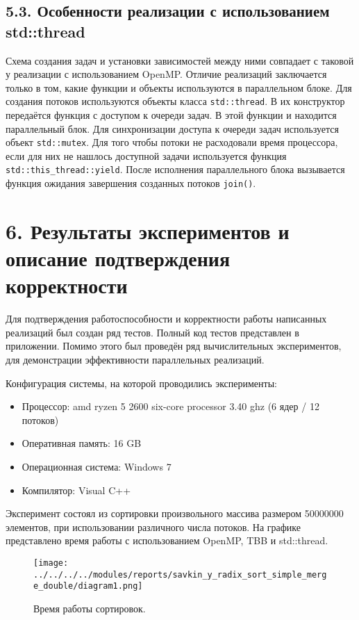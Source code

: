 \documentclass{report}
\begin{document}
    \subsection*{5.3. Особенности реализации с использованием std::thread}
    \par Схема создания задач и установки зависимостей между ними совпадает с таковой у реализации с использованием OpenMP.
         Отличие реализаций заключается только в том, какие функции и объекты используются в параллельном блоке.
         Для создания потоков используются объекты класса \verb|std::thread|. В их конструктор передаётся функция с доступом к очереди задач. В этой функции и находится параллельный блок.
         Для синхронизации доступа к очереди задач используется объект \verb|std::mutex|.
         Для того чтобы потоки не расходовали время процессора, если для них не нашлось доступной задачи используется функция \verb|std::this_thread::yield|.
         После исполнения параллельного блока вызывается функция ожидания завершения созданных потоков \verb|join()|.


    \newpage
    \section*{6. Результаты экспериментов и описание подтверждения корректности}
    \par Для подтверждения работоспособности и корректности работы написанных реализаций был создан ряд тестов. Полный код тестов представлен в приложении.
         Помимо этого был проведён ряд вычислительных экспериментов, для демонстрации эффективности параллельных реализаций.
    \par Конфигурация системы, на которой проводились эксперименты:
    \begin{itemize}
        \item Процессор: amd ryzen 5 2600 six-core processor 3.40 ghz (6 ядер / 12 потоков)
        \item Оперативная память: 16 GB
        \item Операционная система: Windows 7
        \item Компилятор: Visual C++
    \end{itemize}

    \par Эксперимент состоял из сортировки произвольного массива размером 50000000 элементов, при использовании различного числа потоков.
         На графике представлено время работы с использованием OpenMP, TBB и std::thread.
    \begin{figure}[htbp]
        \centering
        \texttt{[image: ../../../../modules/reports/savkin\_y\_radix\_sort\_simple\_merge\_double/diagram1.png]}
        \caption{Время работы сортировок.}
    \end{figure}
\end{document}
